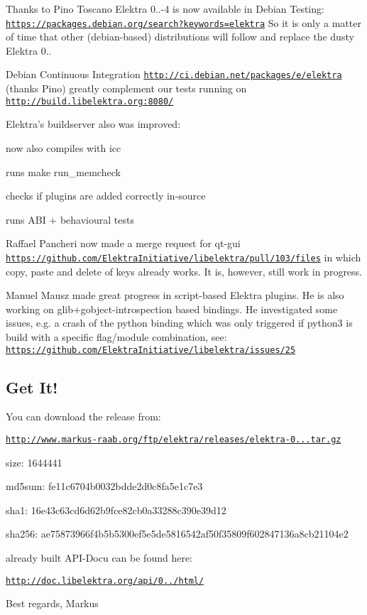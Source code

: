 Thanks to Pino Toscano Elektra 0..-\/4 is now available in Debian Testing\+: \href{https://packages.debian.org/search?keywords=elektra}{\tt https\+://packages.\+debian.\+org/search?keywords=elektra} So it is only a matter of time that other (debian-\/based) distributions will follow and replace the dusty Elektra 0..

Debian Continuous Integration \href{http://ci.debian.net/packages/e/elektra}{\tt http\+://ci.\+debian.\+net/packages/e/elektra} (thanks Pino) greatly complement our tests running on \href{http://build.libelektra.org:8080/}{\tt http\+://build.\+libelektra.\+org\+:8080/}

Elektra's buildserver also was improved\+:


\begin{DoxyItemize}
\item now also compiles with icc
\item runs make run\+\_\+memcheck
\item checks if plugins are added correctly in-\/source
\item runs A\+B\+I + behavioural tests
\end{DoxyItemize}

Raffael Pancheri now made a merge request for qt-\/gui \href{https://github.com/ElektraInitiative/libelektra/pull/103/files}{\tt https\+://github.\+com/\+Elektra\+Initiative/libelektra/pull/103/files} in which copy, paste and delete of keys already works. It is, however, still work in progress.

Manuel Mausz made great progress in script-\/based Elektra plugins. He is also working on glib+gobject-\/introspection based bindings. He investigated some issues, e.\+g. a crash of the python binding which was only triggered if python3 is build with a specific flag/module combination, see\+: \href{https://github.com/ElektraInitiative/libelektra/issues/25}{\tt https\+://github.\+com/\+Elektra\+Initiative/libelektra/issues/25}

\subsection*{Get It!}

You can download the release from\+:

\href{http://www.markus-raab.org/ftp/elektra/releases/elektra-0.8.8.tar.gz}{\tt http\+://www.\+markus-\/raab.\+org/ftp/elektra/releases/elektra-\/0...\+tar.\+gz}


\begin{DoxyItemize}
\item size\+: 1644441
\item md5sum\+: fe11c6704b0032bdde2d0c8fa5e1c7e3
\item sha1\+: 16e43c63cd6d62b9fce82cb0a33288c390e39d12
\item sha256\+: ae75873966f4b5b5300ef5e5de5816542af50f35809f602847136a8cb21104e2
\end{DoxyItemize}

already built A\+P\+I-\/\+Docu can be found here\+:

\href{http://doc.libelektra.org/api/0.8.8/html/}{\tt http\+://doc.\+libelektra.\+org/api/0../html/}

Best regards, Markus 